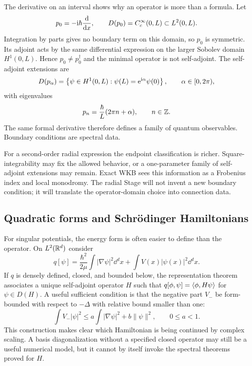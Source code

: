 The derivative on an interval shows why an operator is more than a formula.
Let
\begin{equation}
  p_0=-\mathrm{i}\hbar\frac{\mathrm{d}}{\mathrm{d} x},
  \qquad
  D(p_0)=C_c^\infty(0,L)
  \subset L^2(0,L).
  \label{eq:minimal-momentum}
\end{equation}
Integration by parts gives no boundary term on this domain, so $p_0$ is
symmetric.  Its adjoint acts by the same differential expression on the
larger Sobolev domain $H^1(0,L)$.  Hence $p_0\neq p_0^\dagger$ and the minimal
operator is not self-adjoint.  The self-adjoint extensions are
\begin{equation}
  D(p_\alpha)=\left\{\psi\in H^1(0,L):
    \psi(L)=\mathrm{e}^{\mathrm{i}\alpha}\psi(0)\right\},
  \qquad \alpha\in[0,2\pi),
  \label{eq:momentum-extensions}
\end{equation}
with eigenvalues
\begin{equation}
  p_n=\frac{\hbar}{L}(2\pi n+\alpha),
  \qquad n\in\mathbb{Z}.
  \label{eq:momentum-extension-spectrum}
\end{equation}
The same formal derivative therefore defines a family of quantum
observables.  Boundary conditions are spectral data.

For a second-order radial expression the endpoint classification is richer.
Square-integrability may fix the allowed behavior, or a one-parameter family
of self-adjoint extensions may remain.  Exact WKB sees this information as a
Frobenius index and local monodromy.  The radial Stage will not invent a new
boundary condition; it will translate the operator-domain choice into
connection data.

\subsection{Quadratic forms and Schr\"odinger Hamiltonians}
\label{subsec:quadratic-form-hamiltonian}

For singular potentials, the energy form is often easier to define than the
operator.  On $L^2(\mathbb{R}^d)$ consider
\begin{equation}
  q[\psi]
  =\frac{\hbar^2}{2\mu}\int|\nabla\psi|^2\dd^dx
   +\int V(x)|\psi(x)|^2\dd^dx .
  \label{eq:schrodinger-form}
\end{equation}
If $q$ is densely defined, closed, and bounded below, the representation
theorem associates a unique self-adjoint operator $H$ such that
$q[\phi,\psi]=\langle \phi,H\psi\rangle$ for $\psi\in D(H)$.  A useful
sufficient condition is that the negative part $V_-$ be form-bounded with
respect to $-\Delta$ with relative bound smaller than one:
\begin{equation}
  \int V_-|\psi|^2
  \leq a\int|\nabla\psi|^2+b\|\psi\|^2,
  \qquad 0\leq a<1.
  \label{eq:form-bound}
\end{equation}
This construction makes clear which Hamiltonian is being continued by
complex scaling.  A basis diagonalization without a specified closed
operator may still be a useful numerical model, but it cannot by itself
invoke the spectral theorems proved for $H$.

